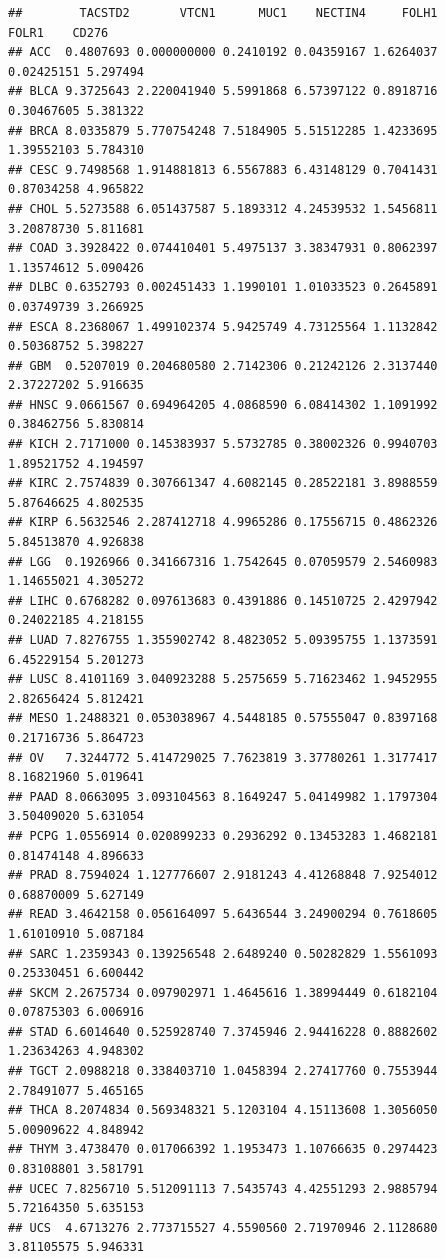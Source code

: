 \documentclass[
]{book}
\begin{document}
\begin{verbatim}
##        TACSTD2       VTCN1      MUC1    NECTIN4     FOLH1      FOLR1    CD276
## ACC  0.4807693 0.000000000 0.2410192 0.04359167 1.6264037 0.02425151 5.297494
## BLCA 9.3725643 2.220041940 5.5991868 6.57397122 0.8918716 0.30467605 5.381322
## BRCA 8.0335879 5.770754248 7.5184905 5.51512285 1.4233695 1.39552103 5.784310
## CESC 9.7498568 1.914881813 6.5567883 6.43148129 0.7041431 0.87034258 4.965822
## CHOL 5.5273588 6.051437587 5.1893312 4.24539532 1.5456811 3.20878730 5.811681
## COAD 3.3928422 0.074410401 5.4975137 3.38347931 0.8062397 1.13574612 5.090426
## DLBC 0.6352793 0.002451433 1.1990101 1.01033523 0.2645891 0.03749739 3.266925
## ESCA 8.2368067 1.499102374 5.9425749 4.73125564 1.1132842 0.50368752 5.398227
## GBM  0.5207019 0.204680580 2.7142306 0.21242126 2.3137440 2.37227202 5.916635
## HNSC 9.0661567 0.694964205 4.0868590 6.08414302 1.1091992 0.38462756 5.830814
## KICH 2.7171000 0.145383937 5.5732785 0.38002326 0.9940703 1.89521752 4.194597
## KIRC 2.7574839 0.307661347 4.6082145 0.28522181 3.8988559 5.87646625 4.802535
## KIRP 6.5632546 2.287412718 4.9965286 0.17556715 0.4862326 5.84513870 4.926838
## LGG  0.1926966 0.341667316 1.7542645 0.07059579 2.5460983 1.14655021 4.305272
## LIHC 0.6768282 0.097613683 0.4391886 0.14510725 2.4297942 0.24022185 4.218155
## LUAD 7.8276755 1.355902742 8.4823052 5.09395755 1.1373591 6.45229154 5.201273
## LUSC 8.4101169 3.040923288 5.2575659 5.71623462 1.9452955 2.82656424 5.812421
## MESO 1.2488321 0.053038967 4.5448185 0.57555047 0.8397168 0.21716736 5.864723
## OV   7.3244772 5.414729025 7.7623819 3.37780261 1.3177417 8.16821960 5.019641
## PAAD 8.0663095 3.093104563 8.1649247 5.04149982 1.1797304 3.50409020 5.631054
## PCPG 1.0556914 0.020899233 0.2936292 0.13453283 1.4682181 0.81474148 4.896633
## PRAD 8.7594024 1.127776607 2.9181243 4.41268848 7.9254012 0.68870009 5.627149
## READ 3.4642158 0.056164097 5.6436544 3.24900294 0.7618605 1.61010910 5.087184
## SARC 1.2359343 0.139256548 2.6489240 0.50282829 1.5561093 0.25330451 6.600442
## SKCM 2.2675734 0.097902971 1.4645616 1.38994449 0.6182104 0.07875303 6.006916
## STAD 6.6014640 0.525928740 7.3745946 2.94416228 0.8882602 1.23634263 4.948302
## TGCT 2.0988218 0.338403710 1.0458394 2.27417760 0.7553944 2.78491077 5.465165
## THCA 8.2074834 0.569348321 5.1203104 4.15113608 1.3056050 5.00909622 4.848942
## THYM 3.4738470 0.017066392 1.1953473 1.10766635 0.2974423 0.83108801 3.581791
## UCEC 7.8256710 5.512091113 7.5435743 4.42551293 2.9885794 5.72164350 5.635153
## UCS  4.6713276 2.773715527 4.5590560 2.71970946 2.1128680 3.81105575 5.946331

\end{verbatim}
\end{document}
